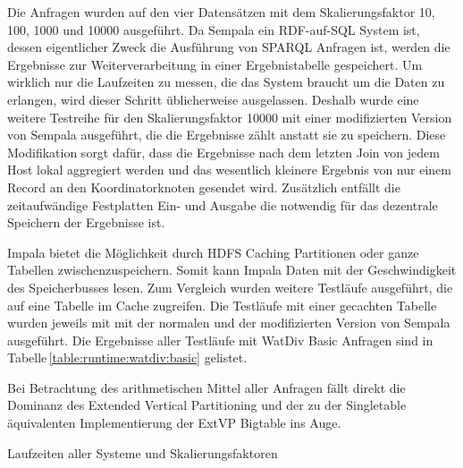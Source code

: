 \documentclass[
  a4paper,
  twocolumn
]{scrartcl}
\begin{document}
Die Anfragen wurden auf den vier Datensätzen mit dem Skalierungsfaktor 10, 100, 1000 und 10000 ausgeführt. Da Sempala ein RDF-auf-SQL System ist, dessen eigentlicher Zweck die Ausführung von SPARQL Anfragen ist, werden die Ergebnisse zur Weiterverarbeitung in einer Ergebnistabelle gespeichert. Um wirklich nur die Laufzeiten zu messen, die das System braucht um die Daten zu erlangen, wird dieser Schritt üblicherweise ausgelassen. Deshalb wurde eine weitere Testreihe für den Skalierungsfaktor 10000 mit einer modifizierten Version von Sempala ausgeführt, die die Ergebnisse zählt anstatt sie zu speichern. Diese Modifikation sorgt dafür, dass die Ergebnisse nach dem letzten Join von jedem Host lokal aggregiert werden und das wesentlich kleinere Ergebnis von nur einem Record an den Koordinatorknoten gesendet wird. Zusätzlich entfällt die zeitaufwändige Festplatten Ein- und Ausgabe die notwendig für das dezentrale Speichern der Ergebnisse ist.

Impala bietet die Möglichkeit durch HDFS Caching Partitionen oder ganze Tabellen zwischenzuspeichern. Somit kann Impala Daten mit der Geschwindigkeit des Speicherbusses lesen\cite{impala}. Zum Vergleich wurden weitere Testläufe ausgeführt, die auf eine Tabelle im Cache zugreifen. Die Testläufe mit einer gecachten Tabelle wurden jeweils mit mit der normalen und der modifizierten Version von Sempala ausgeführt. Die Ergebnisse aller Testläufe mit WatDiv Basic Anfragen sind in Tabelle\,\ref{table:runtime:watdiv:basic} gelistet.

Bei Betrachtung des arithmetischen Mittel aller Anfragen fällt direkt die Dominanz des Extended Vertical Partitioning und der zu der Singletable äquivalenten Implementierung der ExtVP Bigtable ins Auge.


 Laufzeiten aller Systeme und Skalierungsfaktoren 
\end{document}
